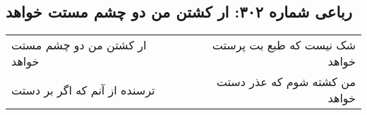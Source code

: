 \begin{center}
\section*{رباعی شماره ۳۰۲: ار کشتن من دو چشم مستت خواهد}
\label{sec:sh302}
\begin{longtable}{l p{0.5cm} r}
ار کشتن من دو چشم مستت خواهد
&&
شک نیست که طبع بت پرستت خواهد
\\
ترسنده از آنم که اگر بر دستت
&&
من کشته شوم که عذر دستت خواهد
\\
\end{longtable}
\end{center}
